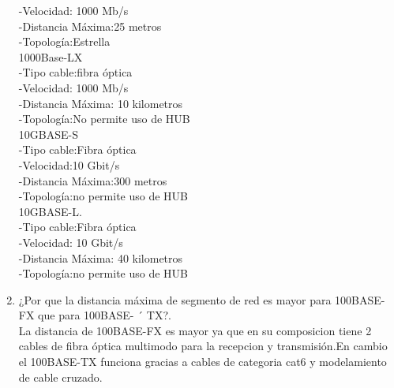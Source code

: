 \documentclass{udparticle}
\begin{document}
\begin{enumerate}
        -Velocidad: 1000 Mb/s\\
        -Distancia Máxima:25 metros\\
        -Topología:Estrella\\ 
    1000Base-LX\\
        -Tipo cable:fibra óptica\\
        -Velocidad: 1000 Mb/s\\
        -Distancia Máxima: 10 kilometros\\
        -Topología:No permite uso de HUB\\
    10GBASE-S\\
        -Tipo cable:Fibra óptica\\
        -Velocidad:10 Gbit/s\\
        -Distancia Máxima:300 metros\\
        -Topología:no permite uso de HUB\\
    10GBASE-L.\\
        -Tipo cable:Fibra óptica\\
        -Velocidad:  10 Gbit/s\\
        -Distancia Máxima: 40 kilometros\\
        -Topología:no permite uso de HUB\\

\item ¿Por que la distancia máxima de segmento de red es mayor para 100BASE-FX que para 100BASE- ´
TX?.\\
  La distancia de 100BASE-FX es mayor ya que en su composicion tiene 2 cables de fibra óptica multimodo para la recepcion y
  transmisión.En cambio el 100BASE-TX funciona gracias a cables de categoria cat6 y modelamiento de cable cruzado.


\end{enumerate}
\end{document}
